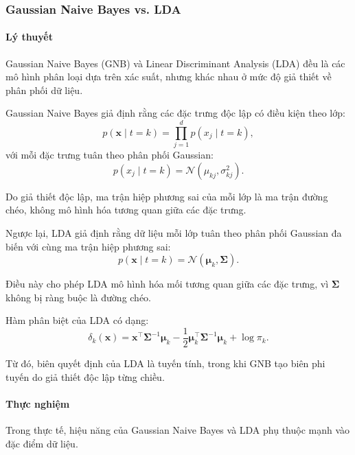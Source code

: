 \subsubsection{Gaussian Naive Bayes vs. LDA}
\paragraph{Lý thuyết}
Gaussian Naive Bayes (GNB) và Linear Discriminant Analysis (LDA) đều là các mô
hình phân loại dựa trên xác suất, nhưng khác nhau ở mức độ giả thiết về phân
phối dữ liệu.

Gaussian Naive Bayes giả định rằng các đặc trưng độc lập có điều kiện theo
lớp:
\begin{equation}
  p(\boldsymbol{x} \mid t=k)
  = \prod_{j=1}^{d} p(x_j \mid t=k),
\end{equation}
với mỗi đặc trưng tuân theo phân phối Gaussian:
\begin{equation}
  p(x_j \mid t=k)
  = \mathcal{N}(\mu_{kj}, \sigma_{kj}^2).
\end{equation}

Do giả thiết độc lập, ma trận hiệp phương sai của mỗi lớp là ma trận đường
chéo, không mô hình hóa tương quan giữa các đặc trưng.

Ngược lại, LDA giả định rằng dữ liệu mỗi lớp tuân theo phân phối Gaussian đa
biến với cùng ma trận hiệp phương sai:
\begin{equation}
  p(\boldsymbol{x} \mid t=k)
  = \mathcal{N}(\boldsymbol{\mu}_k, \boldsymbol{\Sigma}).
\end{equation}

Điều này cho phép LDA mô hình hóa mối tương quan giữa các đặc trưng, vì
$\boldsymbol{\Sigma}$ không bị ràng buộc là đường chéo.

Hàm phân biệt của LDA có dạng:
\begin{equation}
  \delta_k(\boldsymbol{x}) =
  \boldsymbol{x}^\intercal \boldsymbol{\Sigma}^{-1} \boldsymbol{\mu}_k
  - \frac{1}{2}
  \boldsymbol{\mu}_k^\intercal \boldsymbol{\Sigma}^{-1}
  \boldsymbol{\mu}_k
  + \log \pi_k.
\end{equation}

Từ đó, biên quyết định của LDA là tuyến tính, trong khi GNB tạo biên phi tuyến
do giả thiết độc lập từng chiều.

\paragraph{Thực nghiệm}
Trong thực tế, hiệu năng của Gaussian Naive Bayes và LDA phụ thuộc mạnh vào
đặc điểm dữ liệu.

